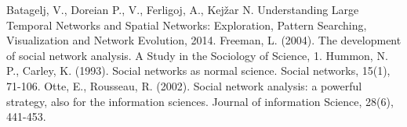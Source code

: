 \documentclass[11pt]{article} %
\begin{document}
\begin{thebibliography}{99}
Batagelj, V., Doreian P., V., Ferligoj, A., Kejžar N. Understanding Large Temporal Networks and Spatial Networks: Exploration, Pattern Searching, Visualization and Network Evolution, 2014.
   Freeman, L. (2004). The development of social network analysis. A Study in the Sociology of Science, 1.
   Hummon, N. P., Carley, K. (1993). Social networks as normal science. Social networks, 15(1), 71-106.
   Otte, E., Rousseau, R. (2002). Social network analysis: a powerful strategy, also for the information sciences. Journal of information Science, 28(6), 441-453. 
\end{thebibliography}
\end{document}
